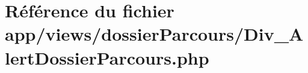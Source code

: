\hypertarget{_div___alert_dossier_parcours_8php}{}\section{Référence du fichier app/views/dossier\+Parcours/\+Div\+\_\+\+Alert\+Dossier\+Parcours.php}
\label{_div___alert_dossier_parcours_8php}
